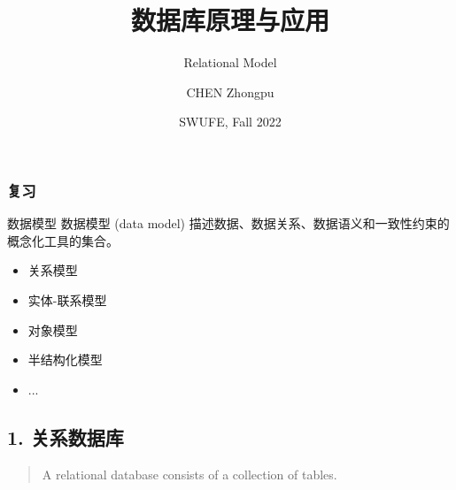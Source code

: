 \documentclass[aspectratio=169, 14pt]{beamer}
\title[Database Principles and Applications] %
{数据库原理与应用}
\subtitle{Relational Model}
\author[CHEN Zhongpu] %
{CHEN Zhongpu}
\institute[] %
{
  School of Computing and Artificial Intelligence \\
  \href{mailto:zpchen@swufe.edu.cn}{zpchen@swufe.edu.cn}
}
\date[] %
{SWUFE, Fall 2022}
\begin{document}
\frame{\titlepage}

\begin{frame}
    \frametitle{复习}
    \begin{block}{数据模型}
        数据模型 (data model) 描述数据、数据关系、数据语义和一致性约束的概念化工具的集合。
    \end{block}
    \begin{itemize}
        \item \alert{关系模型}
        \item 实体-联系模型
        \item 对象模型
        \item 半结构化模型
        \item ...        
    \end{itemize}
\end{frame}

{
    \begin{frame}
        \section{\textcolor{darkmidnightblue}{1. 关系数据库}}
        \begin{quote}
            A relational database consists of a collection of \alert{tables}.
        \end{quote}
    \end{frame}
}
\end{document}

